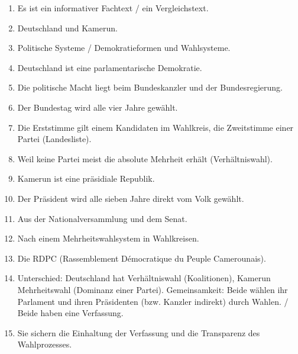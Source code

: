 \documentclass[11pt]{article}
\begin{document}
\begin{corrige}
\begin{enumerate}
    \item Es ist ein informativer Fachtext / ein Vergleichstext.
    \item Deutschland und Kamerun.
    \item Politische Systeme / Demokratieformen und Wahlsysteme.
    \item Deutschland ist eine parlamentarische Demokratie.
    \item Die politische Macht liegt beim Bundeskanzler und der Bundesregierung.
    \item Der Bundestag wird alle vier Jahre gewählt.
    \item Die Erststimme gilt einem Kandidaten im Wahlkreis, die Zweitstimme einer Partei (Landesliste).
    \item Weil keine Partei meist die absolute Mehrheit erhält (Verhältniswahl).
    \item Kamerun ist eine präsidiale Republik.
    \item Der Präsident wird alle sieben Jahre direkt vom Volk gewählt.
    \item Aus der Nationalversammlung und dem Senat.
    \item Nach einem Mehrheitswahlsystem in Wahlkreisen.
    \item Die RDPC (Rassemblement Démocratique du Peuple Camerounais).
    \item Unterschied: Deutschland hat Verhältniswahl (Koalitionen), Kamerun Mehrheitswahl (Dominanz einer Partei). Gemeinsamkeit: Beide wählen ihr Parlament und ihren Präsidenten (bzw. Kanzler indirekt) durch Wahlen. / Beide haben eine Verfassung.
    \item Sie sichern die Einhaltung der Verfassung und die Transparenz des Wahlprozesses.
\end{enumerate}
\end{corrige}
\end{document}
